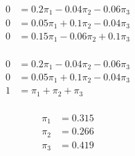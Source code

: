 \documentclass{templateNote}
\begin{document}
\begin{center}
\begin{enumerate}[label=\alph*)]
        \begin{align*}
            0 &= 0.2\pi_1 - 0.04\pi_2 - 0.06\pi_3 \\
            0 &= 0.05\pi_1 + 0.1\pi_2 - 0.04\pi_3 \\
            0 &= 0.15\pi_1 - 0.06\pi_2 + 0.1\pi_3 \\
        \end{align*}
        
        
        \begin{align*}
            0 &= 0.2\pi_1 - 0.04\pi_2 - 0.06\pi_3 \\
            0 &= 0.05\pi_1 + 0.1\pi_2 - 0.04\pi_3 \\
            1 &= \pi_1 + \pi_2 + \pi_3 \\
        \end{align*}
        
        
        \begin{align*}
            \pi_1 &= 0.315 \\
            \pi_2 &= 0.266 \\
            \pi_3 &= 0.419 \\
        \end{align*}

    \end{enumerate}
\end{center}
\end{document}

